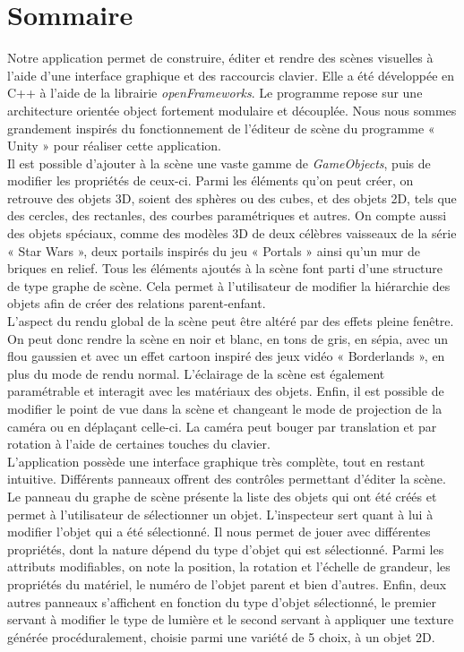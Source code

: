 \section{Sommaire}
\label{s:sommaire}

Notre application permet de construire, éditer et rendre des scènes visuelles à l'aide d'une interface graphique et des raccourcis clavier.
Elle a été développée en C++ à l'aide de la librairie \emph{openFrameworks}.
Le programme repose sur une architecture orientée object fortement modulaire et découplée.
Nous nous sommes grandement inspirés du fonctionnement de l'éditeur de scène du programme « Unity » pour réaliser cette application.\\

Il est possible d'ajouter à la scène une vaste gamme de \emph{GameObjects}, puis de modifier les propriétés de ceux-ci.
Parmi les éléments qu'on peut créer, on retrouve des objets 3D, soient des sphères ou des cubes, et des objets 2D, tels que des cercles, des rectanles, des courbes paramétriques et autres.
On compte aussi des objets spéciaux, comme des modèles 3D de deux célèbres vaisseaux de la série « Star Wars », deux portails inspirés du jeu « Portals » ainsi qu'un mur de briques en relief. Tous les éléments ajoutés à la scène font parti d'une structure de type graphe de scène. Cela permet à l'utilisateur de modifier la hiérarchie des objets afin de créer des relations parent-enfant.\\

L'aspect du rendu global de la scène peut être altéré par des effets pleine fenêtre.
On peut donc rendre la scène en noir et blanc, en tons de gris, en sépia, avec un flou gaussien et avec un effet cartoon inspiré des jeux vidéo « Borderlands », en plus du mode de rendu normal.
L'éclairage de la scène est également paramétrable et interagit avec les matériaux des objets.
Enfin, il est possible de modifier le point de vue dans la scène et changeant le mode de projection de la caméra ou en déplaçant celle-ci.
La caméra peut bouger par translation et par rotation à l’aide de certaines touches du clavier.\\

L'application possède une interface graphique très complète, tout en restant intuitive.
Différents panneaux offrent des contrôles permettant d'éditer la scène.
Le panneau du graphe de scène présente la liste des objets qui ont été créés et permet à l'utilisateur de sélectionner un objet.
L'inspecteur sert quant à lui à modifier l'objet qui a été sélectionné.
Il nous permet de jouer avec différentes propriétés, dont la nature dépend du type d'objet qui est sélectionné.
Parmi les attributs modifiables, on note la position, la rotation et l’échelle de grandeur, les propriétés du matériel, le numéro de l'objet parent et bien d'autres.
Enfin, deux autres panneaux s'affichent en fonction du type d'objet sélectionné, le premier servant à modifier le type de lumière et le second servant à appliquer une texture générée procéduralement, choisie parmi une variété de 5 choix, à un objet 2D.\\


